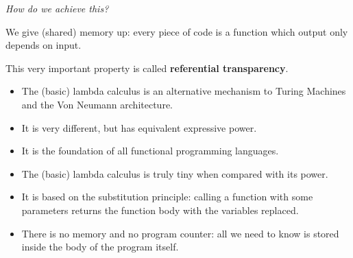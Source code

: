 \documentclass{beamer}
\begin{document}
\begin{frame}[fragile]{\CurrentSection}
\begin{exampleblock}{}
\textit{How do we achieve this?}
\end{exampleblock}

 
\pause 
\begin{exampleblock}{}
We give (shared) memory up: every piece of code is a function which output only depends on input.
\end{exampleblock}

 
\begin{exampleblock}{}
This very important property is called \textbf{referential transparency}.
\end{exampleblock}

 

\end{frame}

\begin{frame}[fragile]{\CurrentSection}
\begin{block}{\CurrentSubSection}
\begin{itemize}
\item The (basic) lambda calculus is an alternative mechanism to Turing Machines and the Von Neumann architecture.
\item It is very different, but has equivalent expressive power.
\item It is the foundation of all functional programming languages.

\end{itemize}

\end{block}


\end{frame}

\begin{frame}[fragile]{\CurrentSection}
\begin{block}{\CurrentSubSection}
\begin{itemize}
\item The (basic) lambda calculus is truly tiny when compared with its power.
\item It is based on the substitution principle: calling a function with some parameters returns the function body with the variables replaced.
\item There is no memory and no program counter: all we need to know is stored inside the body of the program itself.

\end{itemize}

\end{block}


\end{frame}
\end{document}
